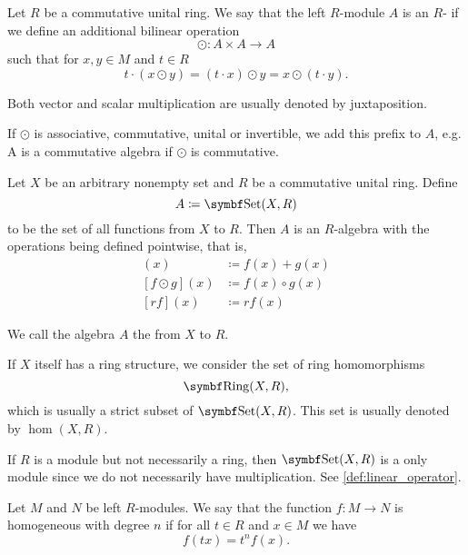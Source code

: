 \begin{definition}\label{def:algebra_over_ring}\cite[408]{Knapp2016BAlg}
  Let \( R \) be a commutative unital ring. We say that the left \( R \)-module \( A \) is an \( R \)- if we define an additional bilinear  operation
  \begin{equation*}
    \odot: A \times A \to A
  \end{equation*}
  such that for \( x, y \in M \) and \( t \in R \)
  \begin{equation*}
    t \cdot (x \odot y) = (t \cdot x) \odot y = x \odot (t \cdot y).
  \end{equation*}

  Both vector and scalar multiplication are usually denoted by juxtaposition.

  If \( \odot \) is associative, commutative, unital or invertible, we add this prefix to \( A \), e.g. A is a commutative algebra if \( \odot \) is commutative.
\end{definition}

\begin{proposition}\label{thm:functions_over_ring_form_algebra}
  Let \( X \) be an arbitrary nonempty set and \( R \) be a commutative unital ring. Define
  \begin{equation*}
    A \coloneqq \Cat{Set}(X, R)
  \end{equation*}
  to be the set of all functions from \( X \) to \( R \). Then \( A \) is an \( R \)-algebra with the operations being defined pointwise, that is,
  \begin{align*}
    [f + g](x) &\coloneqq f(x) + g(x) \\
    [f \odot g](x) &\coloneqq f(x) \circ g(x) \\
    [rf](x) &\coloneqq r f(x) 
  \end{align*}

  We call the algebra \( A \) the  from \( X \) to \( R \).

  If \( X \) itself has a ring structure, we consider the set of ring homomorphisms
  \begin{equation*}
    \Cat{Ring}(X, R),
  \end{equation*}
  which is usually a strict subset of \( \Cat{Set}(X, R) \). This set is usually denoted by \( \hom(X, R) \).

  If \( R \) is a module but not necessarily a ring, then \( \Cat{Set}(X, R) \) is a only module since we do not necessarily have multiplication. See \cref{def:linear_operator}.
\end{proposition}

\begin{definition}\label{def:homogenous_function}
  Let \( M \) and \( N \) be left \( R \)-modules. We say that the function \( f: M \to N \) is homogeneous with degree \( n \) if for all \( t \in R \) and \( x \in M \) we have
  \begin{equation*}
    f(t x) = t^n f(x).
  \end{equation*}
\end{definition}
